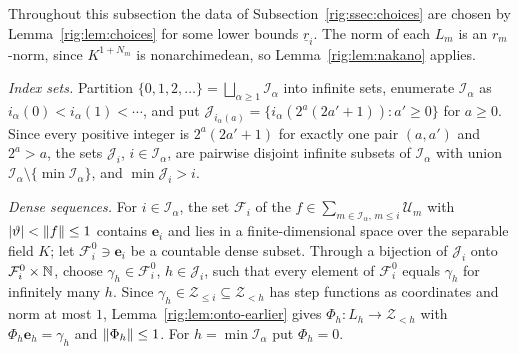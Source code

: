 Throughout this subsection the data of Subsection~\ref{rig:ssec:choices} are chosen by Lemma~\ref{rig:lem:choices} for
some lower bounds $\underline r_i$. The norm of each $L_m$ is an $r_m$\nobreakdash-norm, since $K^{1+N_m}$ is
nonarchimedean, so Lemma~\ref{rig:lem:nakano} applies.

\emph{Index sets.} Partition $\{0,1,2,\dots\}=\bigsqcup_{\alpha\ge1}\mathcal I_\alpha$ into infinite sets, enumerate
$\mathcal I_\alpha$ as $i_\alpha(0)<i_\alpha(1)<\cdots$, and put $\mathcal J_{i_\alpha(a)}=\{i_\alpha(2^a(2a'+1)):a'\ge0\}$
for $a\ge0$. Since every positive integer is $2^a(2a'+1)$ for exactly one pair $(a,a')$ and $2^a>a$, the sets
$\mathcal J_i$, $i\in\mathcal I_\alpha$, are pairwise disjoint infinite subsets of $\mathcal I_\alpha$ with union
$\mathcal I_\alpha\setminus\{\min\mathcal I_\alpha\}$, and $\min\mathcal J_i>i$.

\emph{Dense sequences.} For $i\in\mathcal I_\alpha$, the set $\mathcal F_i$ of the
$f\in\sum_{m\in\mathcal I_\alpha,\,m\le i}\mathcal U_m$ with $\lvert \vartheta\rvert<\lVert f\rVert\le1$ contains $\mathbf e_i$ and lies
in a finite-dimensional space over the separable field $K$; let $\mathcal F^0_i\ni\mathbf e_i$ be a countable dense
subset. Through a bijection of $\mathcal J_i$ onto $\mathcal F^0_i\times\mathbb N$, choose $\gamma_h\in\mathcal F^0_i$,
$h\in\mathcal J_i$, such that every element of $\mathcal F^0_i$ equals $\gamma_h$ for infinitely many $h$. Since
$\gamma_h\in\mathcal Z_{\le i}\subseteq\mathcal Z_{<h}$ has step functions as coordinates and norm at most $1$,
Lemma~\ref{rig:lem:onto-earlier} gives $\Phi_h\colon L_h\to\mathcal Z_{<h}$ with $\Phi_h\mathbf e_h=\gamma_h$ and
$\lVert \Phi_h\rVert\le1$. For $h=\min\mathcal I_\alpha$ put $\Phi_h=0$.

